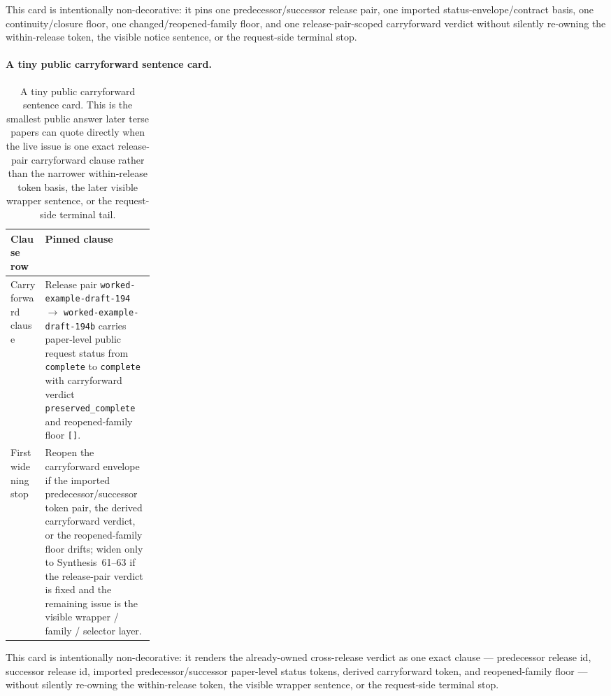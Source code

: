 \documentclass[11pt]{article}
\begin{document}
This card is intentionally non-decorative: it pins one predecessor/successor release pair, one imported status-envelope/contract basis, one continuity/closure floor, one changed/reopened-family floor, and one release-pair-scoped carryforward verdict without silently re-owning the within-release token, the visible notice sentence, or the request-side terminal stop.\cite{series:workedexample}

\paragraph{A tiny public carryforward sentence card.}
\begin{table}[t]
\centering
\small
\begin{tabularx}{0.97\linewidth}{@{}p{0.24\linewidth}X@{}}
\toprule
\textbf{Clause row} & \textbf{Pinned clause}\\
\midrule
Carryforward clause & Release pair \texttt{worked-example-draft-194} $\to$ \texttt{worked-example-draft-194b} carries paper-level public request status from \texttt{complete} to \texttt{complete} with carryforward verdict \texttt{preserved\_complete} and reopened-family floor \texttt{[]}. \\
First widening stop & Reopen the carryforward envelope if the imported predecessor/successor token pair, the derived carryforward verdict, or the reopened-family floor drifts; widen only to Synthesis~61--63 if the release-pair verdict is fixed and the remaining issue is the visible wrapper / family / selector layer. \\
\bottomrule
\end{tabularx}
\caption{A tiny public carryforward sentence card. This is the smallest public answer later terse papers can quote directly when the live issue is one exact release-pair carryforward clause rather than the narrower within-release token basis, the later visible wrapper sentence, or the request-side terminal tail.}
\label{tab:tiny-public-request-carryforward-sentence-card}
\end{table}

This card is intentionally non-decorative: it renders the already-owned cross-release verdict as one exact clause --- predecessor release id, successor release id, imported predecessor/successor paper-level status tokens, derived carryforward token, and reopened-family floor --- without silently re-owning the within-release token, the visible wrapper sentence, or the request-side terminal stop.\cite{series:workedexample}
\end{document}
